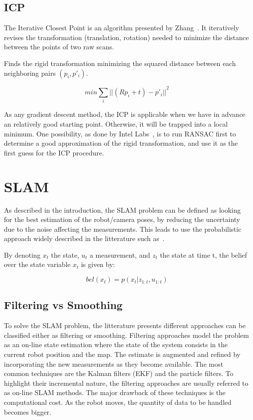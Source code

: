 \subsection{ICP}

The Iterative Closest Point is an algorithm presented by Zhang~\cite{zhang_92_icp}.
It iteratively revises the transformation (translation, rotation) needed to minimize the distance between the points of two raw scans.

Finds the rigid transformation minimizing the squared distance between each neighboring pairs $(p_{i}, p'_{i})$.

\[min \sum_{i}{||(Rp_{i}+t)-p'_{i}||}^2\]

As any gradient descent method, the ICP is applicable when we have in advance an relatively good starting point. Otherwise, it will be trapped into a local minimum. One possibility, as done by Intel Labs~\cite{Intel_RGBD_2010}, is to run RANSAC first to determine a good approximation of the rigid transformation, and use it as the first guess for the ICP procedure.

\section{SLAM}

As described in the introduction, the SLAM problem can be defined as looking for the best estimation of the robot/camera poses, by reducing the uncertainty due to the noise affecting the measurements. This leads to use the probabilistic approach widely described in the litterature such as~\cite{Thrun_2005}.

By denoting $x_t$ the state, $u_t$ a measurement, and $z_t$ the state at time t, the belief over the state variable $x_t$ is given by:

\[bel(x_t) = p(x_t | z_{1:t}, u_{1:t})\]

\subsection{Filtering vs Smoothing}

To solve the SLAM problem, the litterature presents different approaches can be classified either as filtering or smoothing. Filtering approaches model the problem as an on-line state estimation where the state of the system consists in the current robot position and the map. The estimate is augmented and refined by incorporating the new measurements as they become available.
The most common techniques are the Kalman filters (EKF) and the particle filters. To highlight their incremental nature, the filtering approaches are usually referred to as on-line SLAM methods.
The major drawback of these techniques is the computational cost. As the robot moves, the quantity of data to be handled becomes bigger.

